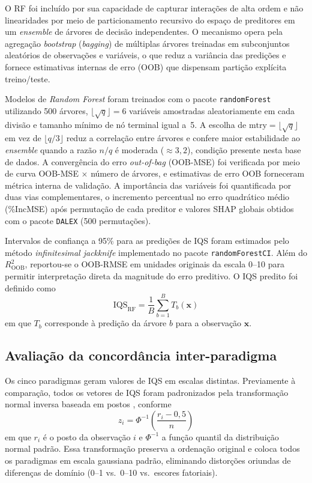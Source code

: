 \documentclass[pdflatex,sn-basic]{sn-jnl}%
\begin{document}
O RF \citep{Breiman2001} foi incluído por sua capacidade de capturar interações de alta ordem e não linearidades por meio de particionamento recursivo do espaço de preditores em um \textit{ensemble} de árvores de decisão independentes. O mecanismo opera pela agregação \textit{bootstrap} (\textit{bagging}) de múltiplas árvores treinadas em subconjuntos aleatórios de observações e variáveis, o que reduz a variância das predições e fornece estimativas internas de erro (OOB) que dispensam partição explícita treino/teste.

Modelos de \textit{Random Forest} foram treinados com o pacote \texttt{randomForest} utilizando 500 árvores, $\lfloor \sqrt{q} \rfloor = 6$ variáveis amostradas aleatoriamente em cada divisão e tamanho mínimo de nó terminal igual a~5. A escolha de $\text{mtry} = \lfloor \sqrt{q} \rfloor$ em vez de $\lfloor q/3 \rfloor$ reduz a correlação entre árvores e confere maior estabilidade ao \textit{ensemble} quando a razão $n/q$ é moderada ($\approx 3{,}2$), condição presente nesta base de dados. A convergência do erro \textit{out-of-bag} (OOB-MSE) foi verificada por meio de curva OOB-MSE $\times$ número de árvores, e estimativas de erro OOB forneceram métrica interna de validação. A importância das variáveis foi quantificada por duas vias complementares, o incremento percentual no erro quadrático médio (\%IncMSE) após permutação de cada preditor e valores SHAP globais obtidos com o pacote \texttt{DALEX} (500 permutações). 

Intervalos de confiança a 95\% para as predições de IQS foram estimados pelo método \textit{infinitesimal jackknife} \citep{Wager2014} implementado no pacote \texttt{randomForestCI}. Além do $R^2_{\text{OOB}}$, reportou-se o OOB-RMSE em unidades originais da escala 0--10 para permitir interpretação direta da magnitude do erro preditivo. O IQS predito foi definido como
\begin{equation}
\text{IQS}_{\text{RF}} = \frac{1}{B}\sum_{b=1}^{B} T_b(\mathbf{x})
\label{eq:rf}
\end{equation}
em que $T_b$ corresponde à predição da árvore $b$ para a observação $\mathbf{x}$.

\subsection{Avaliação da concordância inter-paradigma}\label{subsec:concordance}

Os cinco paradigmas geram valores de IQS em escalas distintas. Previamente à comparação, todos os vetores de IQS foram padronizados pela transformação normal inversa baseada em postos \citep{Blom1958}, conforme
\begin{equation}
z_i = \Phi^{-1}\!\left(\frac{r_i - 0{,}5}{n}\right)
\label{eq:blom}
\end{equation}
em que $r_i$ é o posto da observação $i$ e $\Phi^{-1}$ a função quantil da distribuição normal padrão. Essa transformação preserva a ordenação original e coloca todos os paradigmas em escala gaussiana padrão, eliminando distorções oriundas de diferenças de domínio (0--1 vs.\ 0--10 vs.\ escores fatoriais).
\end{document}

